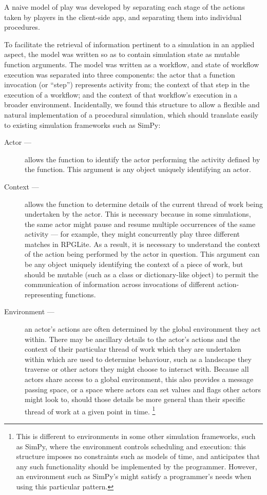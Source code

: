 A naive model of play was developed by separating each stage of the actions
taken by players in the client-side app, and separating them into individual
procedures. 

To facilitate the retrieval of information pertinent to a simulation in an
applied aspect, the model was written so as to contain simulation state as
mutable function arguments. The model was written as a workflow, and state of
workflow execution was separated into three components: the actor that a
function invocation (or ``step'') represents activity from; the context of that
step in the execution of a workflow; and the context of that workflow's
execution in a broader environment. Incidentally, we found this structure to
allow a flexible and natural implementation of a procedural simulation, which
should translate easily to existing simulation frameworks such as
SimPy\cite{simpy_intro}:

\begin{description}
  \item[Actor ---] allows the function to identify the actor performing the activity
    defined by the function. This argument is any object uniquely identifying an
    actor.
  \item[Context ---] allows the function to determine details of the current
    thread of work being undertaken by the actor. This is necessary because in
    some simulations, the same actor might pause and resume multiple occurrences
    of the same activity --- for example, they might concurrently play three
    different matches in RPGLite. As a result, it is necessary to understand the
    context of the action being performed by the actor in question. This
    argument can be any object uniquely identifying the context of a piece of
    work, but should be mutable (such as a class or dictionary-like object) to
    permit the communication of information across invocations of different
    action-representing functions.
  \item[Environment ---] an actor's actions are often determined by the global
    environment they act within. There may be ancillary details to the
    actor's actions and the context of their particular thread of work which
    they are undertaken within which are used to determine behaviour, such
    as a landscape they traverse or other actors they might choose to
    interact with. Because all actors share access to a global environment,
    this also provides a message passing space, or a space where actors can
    set values and flags other actors might look to, should those details be
    more general than their specific thread of work at a given point in time.
    \footnote{This is different to environments in some other simulation frameworks, such
    as SimPy\cite{simpy_documentation}, where the environment controls scheduling and
    execution: this structure imposes no constraints such as models of time, and
    anticipates that any such functionality should be implemented by the
    programmer. However, an environment such as SimPy's might satisfy a programmer's needs
    when using this particular pattern.}
\end{description}

